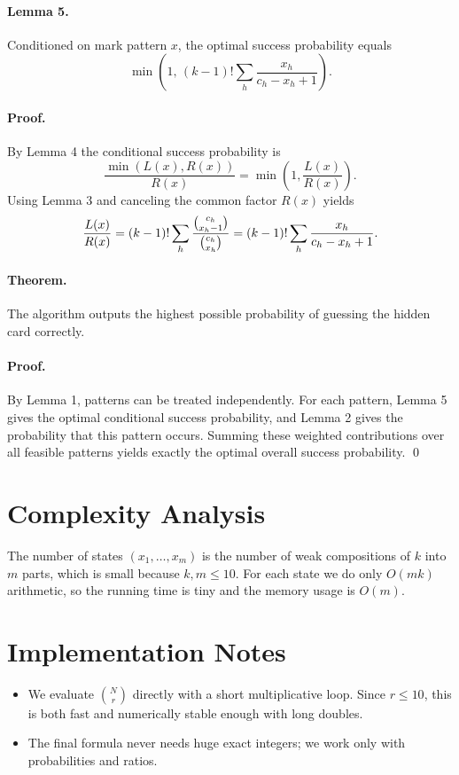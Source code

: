 \documentclass[11pt]{article}
\begin{document}
\paragraph{Lemma 5.}
Conditioned on mark pattern $x$, the optimal success probability equals
\[
    \min\!\left(1,\,
    (k-1)! \sum_h \frac{x_h}{c_h - x_h + 1}\right).
\]

\paragraph{Proof.}
By Lemma 4 the conditional success probability is
\[
    \frac{\min(L(x),R(x))}{R(x)} = \min\!\left(1,\frac{L(x)}{R(x)}\right).
\]
Using Lemma 3 and canceling the common factor $R(x)$ yields
\[
    \frac{L(x)}{R(x)}
    = (k-1)! \sum_h
    \frac{\binom{c_h}{x_h - 1}}{\binom{c_h}{x_h}}
    = (k-1)! \sum_h \frac{x_h}{c_h - x_h + 1}.
    \qedhere
\]

\paragraph{Theorem.}
The algorithm outputs the highest possible probability of guessing the hidden card correctly.

\paragraph{Proof.}
By Lemma 1, patterns can be treated independently. For each pattern, Lemma 5 gives the optimal
conditional success probability, and Lemma 2 gives the probability that this pattern occurs. Summing these
weighted contributions over all feasible patterns yields exactly the optimal overall success probability.
\qed

\section*{Complexity Analysis}

The number of states $(x_1,\dots,x_m)$ is the number of weak compositions of $k$ into $m$ parts, which is
small because $k,m \le 10$. For each state we do only $O(mk)$ arithmetic, so the running time is tiny and
the memory usage is $O(m)$.

\section*{Implementation Notes}

\begin{itemize}[leftmargin=*]
    \item We evaluate $\binom{N}{r}$ directly with a short multiplicative loop. Since $r \le 10$, this is
    both fast and numerically stable enough with long doubles.
    \item The final formula never needs huge exact integers; we work only with probabilities and ratios.
\end{itemize}
\end{document}
